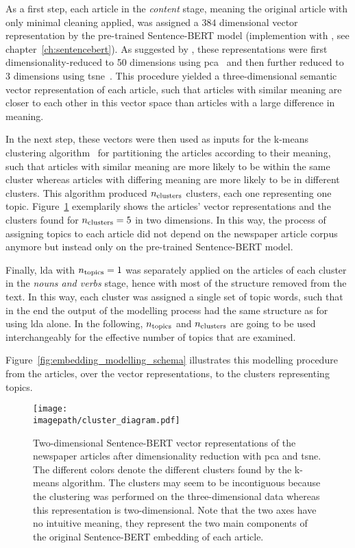 As a first step, each article in the \textit{content} stage, meaning the original article with only minimal cleaning applied, was assigned a $384$ dimensional vector representation by the pre-trained Sentence-BERT model (implemention with \textcite{sbertsentencetransformers_sentencetransformers_nodate}, see chapter~\ref{ch:sentencebert}). As suggested by \textcite{black_using_2020}, these representations were first dimensionality-reduced to \SI{50}{} dimensions using \gls{pca}~\autocite{pearson_liii_1901} and then further reduced to \SI{3}{} dimensions using \gls{tsne}~\autocite{maaten_visualizing_2008}. This procedure yielded a three-dimensional semantic vector representation of each article, such that articles with similar meaning are closer to each other in this vector space than articles with a large difference in meaning.

In the next step, these vectors were then used as inputs for the k-means clustering algorithm~\autocite{macqueen_methods_1967} for partitioning the articles according to their meaning, such that articles with similar meaning are more likely to be within the same cluster whereas articles with differing meaning are more likely to be in different clusters. This algorithm produced $n_\text{clusters}$ clusters, each one representing one topic. Figure~\ref{fig:clusters} exemplarily shows the articles' vector representations and the clusters found for $n_\text{clusters}=5$ in two dimensions. In this way, the process of assigning topics to each article did not depend on the newspaper article corpus anymore but instead only on the pre-trained Sentence-BERT model.

Finally, \gls{lda} with $n_\text{topics}=1$ was separately applied on the articles of each cluster in the \textit{nouns and verbs} stage, hence with most of the structure removed from the text. In this way, each cluster was assigned a single set of topic words, such that in the end the output of the modelling process had the same structure as for using \gls{lda} alone. In the following, $n_\text{topics}$ and $n_\text{clusters}$ are going to be used interchangeably for the effective number of topics that are examined.

Figure~\ref{fig:embedding_modelling_schema} illustrates this modelling procedure from the articles, over the vector representations, to the clusters representing topics.

\begin{figure}
    \centering
    \texttt{[image: \\imagepath/cluster\_diagram.pdf]}
    \caption{Two-dimensional Sentence-BERT vector representations of the newspaper articles after dimensionality reduction with \gls{pca} and \gls{tsne}. The different colors denote the different clusters found by the k-means algorithm. The clusters may seem to be incontiguous because the clustering was performed on the three-dimensional data whereas this representation is two-dimensional. Note that the two axes have no intuitive meaning, they represent the two main components of the original Sentence-BERT embedding of each article.}\label{fig:clusters}
\end{figure}

